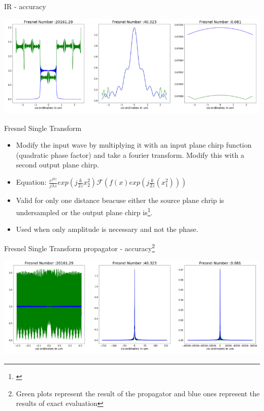 \documentclass{beamer}
\begin{document}
\begin{frame}{IR - accuracy}
\begin{center}
	\includegraphics[scale=0.5]{ir}
\end{center}
\end{frame}


\begin{frame}{Fresnel Single Transform}
\begin{itemize}
	\item Modify the input wave by multiplying it with an input plane chirp function (quadratic phase factor) and take a fourier transform. Modify this with a second output plane chirp. 
		\item Equation:
	$\frac{e^{jkz}}{j\lambda z}exp(j\frac{k}{2z}x_2^{2})\mathcal{F}(f(x)exp(j\frac{k}{2z}(x_1^{2})))$
	\item {Valid for only one distance beacuse either the source plane chrip is undersampled or the output plane chirp is\footnote{\cite{Voelz2009}}. }
	\item Used when only amplitude is necessary and not the phase.
\end{itemize}
\end{frame}

\begin{frame}{Fresnel Single Transform propagator - accuracy\footnote{Green plots represent the result of the propagator and blue ones represent the results of exact evaluation }}
\begin{center}
	\includegraphics[scale=0.5]{fst}
\end{center}
\end{frame}
\end{document}
